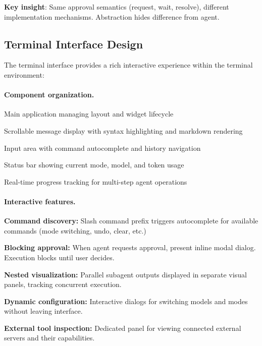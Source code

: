 \textbf{Key insight}: Same approval semantics (request, wait, resolve), different implementation mechanisms. Abstraction hides difference from agent.

\subsection{Terminal Interface Design}
\label{sec:tui}

The terminal interface provides a rich interactive experience within the terminal environment:

\paragraph{Component organization.}
\begin{packeditemize}
\item Main application managing layout and widget lifecycle
\item Scrollable message display with syntax highlighting and markdown rendering
\item Input area with command autocomplete and history navigation
\item Status bar showing current mode, model, and token usage
\item Real-time progress tracking for multi-step agent operations
\end{packeditemize}

\paragraph{Interactive features.}
\begin{packeditemize}
\item \textbf{Command discovery:} Slash command prefix triggers autocomplete for available commands (mode switching, undo, clear, etc.)
\item \textbf{Blocking approval:} When agent requests approval, present inline modal dialog. Execution blocks until user decides.
\item \textbf{Nested visualization:} Parallel subagent outputs displayed in separate visual panels, tracking concurrent execution.
\item \textbf{Dynamic configuration:} Interactive dialogs for switching models and modes without leaving interface.
\item \textbf{External tool inspection:} Dedicated panel for viewing connected external servers and their capabilities.
\end{packeditemize}

